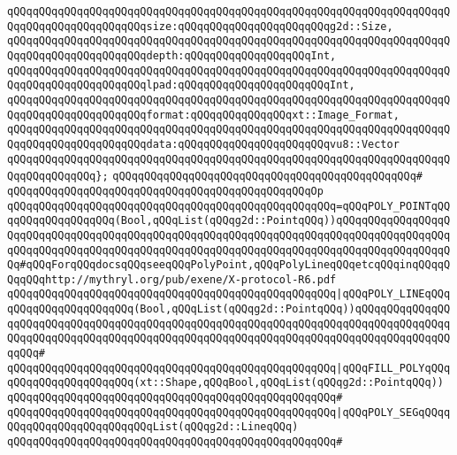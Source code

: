 \verb|qQQqqQQqqQQqqQQqqQQqqQQqqQQqqQQqqQQqqQQqqQQqqQQqqQQqqQQqqQQqqQQqqQQqqQQqqQQqqQQqqQQqqQQqqQQqsize:qQQqqQQqqQQqqQQqqQQqqQQqg2d::Size,|\newline
\verb|qQQqqQQqqQQqqQQqqQQqqQQqqQQqqQQqqQQqqQQqqQQqqQQqqQQqqQQqqQQqqQQqqQQqqQQqqQQqqQQqqQQqqQQqqQQqdepth:qQQqqQQqqQQqqQQqqQQqInt,|\newline
\verb|qQQqqQQqqQQqqQQqqQQqqQQqqQQqqQQqqQQqqQQqqQQqqQQqqQQqqQQqqQQqqQQqqQQqqQQqqQQqqQQqqQQqqQQqqQQqlpad:qQQqqQQqqQQqqQQqqQQqqQQqInt,|\newline
\verb|qQQqqQQqqQQqqQQqqQQqqQQqqQQqqQQqqQQqqQQqqQQqqQQqqQQqqQQqqQQqqQQqqQQqqQQqqQQqqQQqqQQqqQQqqQQqformat:qQQqqQQqqQQqqQQqxt::Image_Format,|\newline
\verb|qQQqqQQqqQQqqQQqqQQqqQQqqQQqqQQqqQQqqQQqqQQqqQQqqQQqqQQqqQQqqQQqqQQqqQQqqQQqqQQqqQQqqQQqqQQqdata:qQQqqQQqqQQqqQQqqQQqqQQqvu8::Vector|\newline
\verb|qQQqqQQqqQQqqQQqqQQqqQQqqQQqqQQqqQQqqQQqqQQqqQQqqQQqqQQqqQQqqQQqqQQqqQQqqQQqqQQqqQQq};|\newline
\verb|qQQqqQQqqQQqqQQqqQQqqQQqqQQqqQQqqQQqqQQqqQQqqQQq#|\newline
\verb|qQQqqQQqqQQqqQQqqQQqqQQqqQQqqQQqqQQqqQQqqQQqqQQqOp|\newline
\verb|qQQqqQQqqQQqqQQqqQQqqQQqqQQqqQQqqQQqqQQqqQQqqQQqqQQq=qQQqPOLY_POINTqQQqqQQqqQQqqQQqqQQq(Bool,qQQqList(qQQqg2d::PointqQQq))qQQqqQQqqQQqqQQqqQQqqQQqqQQqqQQqqQQqqQQqqQQqqQQqqQQqqQQqqQQqqQQqqQQqqQQqqQQqqQQqqQQqqQQqqQQqqQQqqQQqqQQqqQQqqQQqqQQqqQQqqQQqqQQqqQQqqQQqqQQqqQQqqQQqqQQqqQQqqQQq#qQQqForqQQqdocsqQQqseeqQQqPolyPoint,qQQqPolyLineqQQqetcqQQqinqQQqqQQqqQQqhttp://mythryl.org/pub/exene/X-protocol-R6.pdf|\newline
\verb|qQQqqQQqqQQqqQQqqQQqqQQqqQQqqQQqqQQqqQQqqQQqqQQqqQQq|\verb#|qQQqPOLY_LINEqQQqqQQqqQQqqQQqqQQqqQQq(Bool,qQQqList(qQQqg2d::PointqQQq))qQQqqQQqqQQqqQQqqQQqqQQqqQQqqQQqqQQqqQQqqQQqqQQqqQQqqQQqqQQqqQQqqQQqqQQqqQQqqQQqqQQqqQQqqQQqqQQqqQQqqQQqqQQqqQQqqQQqqQQqqQQqqQQqqQQqqQQqqQQqqQQqqQQqqQQqqQQqqQQq#\verb|#|\newline
\verb|qQQqqQQqqQQqqQQqqQQqqQQqqQQqqQQqqQQqqQQqqQQqqQQqqQQq|\verb#|qQQqFILL_POLYqQQqqQQqqQQqqQQqqQQqqQQq(xt::Shape,qQQqBool,qQQqList(qQQqg2d::PointqQQq))#\newline
\verb|qQQqqQQqqQQqqQQqqQQqqQQqqQQqqQQqqQQqqQQqqQQqqQQqqQQq#|\newline
\verb|qQQqqQQqqQQqqQQqqQQqqQQqqQQqqQQqqQQqqQQqqQQqqQQqqQQq|\verb#|qQQqPOLY_SEGqQQqqQQqqQQqqQQqqQQqqQQqqQQqList(qQQqg2d::LineqQQq)#\newline
\verb|qQQqqQQqqQQqqQQqqQQqqQQqqQQqqQQqqQQqqQQqqQQqqQQqqQQq#|\newline
